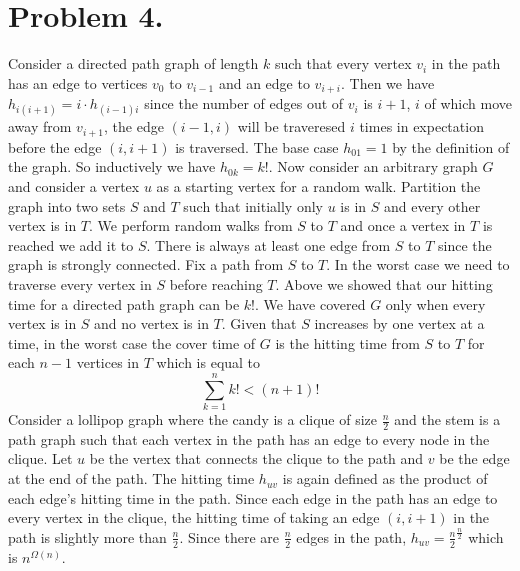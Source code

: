 \documentclass[12pt]{article}
\begin{document}
\section*{Problem 4.}
Consider a directed path graph of length $k$ such that every vertex $v_i$ in the
path has an edge to vertices $v_0$ to $v_{i-1}$ and an edge to $v_{i+i}$. Then
we have $h_{i(i+1)} = i \cdot h_{(i-1)i}$ since the number of edges out of $v_i$
is $i+1$, $i$ of which move away from $v_{i+1}$, the edge $(i-1, i)$ will be
traveresed $i$ times in expectation before the edge $(i,i+1)$ is traversed. The
base case $h_{01} = 1$ by the definition of the graph. So inductively we have
$h_{0k} = k!$. Now consider an arbitrary graph $G$ and consider a vertex
$u$ as a starting vertex for a random walk. Partition the graph into two
sets $S$ and $T$ such that initially only $u$ is in $S$ and every other vertex
is in $T$. We perform random walks from $S$ to $T$ and once a vertex in $T$ is
reached we add it to $S$. There is always at least one edge from $S$ to $T$ since
the graph is strongly connected. Fix a path from $S$ to $T$. In the worst case
we need to traverse every vertex in $S$ before reaching $T$. Above we showed that
our hitting time for a directed path graph can be $k!$. We have covered $G$
only when every vertex is in $S$ and no vertex is in $T$. Given that $S$ increases
by one vertex at a time, in the worst case the cover time of $G$ is the hitting
time from $S$ to $T$ for each $n-1$ vertices in $T$ which is equal to
$$\sum_{k=1}^{n} k! < (n+1)!$$
Consider a lollipop graph where the candy is a clique of size $\frac{n}{2}$ and
the stem is a path graph such that each vertex in the path has an edge to every
node in the clique. Let $u$ be the vertex that connects the clique to the
path and $v$ be the edge at the end of the path. The hitting time $h_{uv}$ is
again defined as the product of each edge's hitting time in the path. Since
each edge in the path has an edge to every vertex in the clique, the hitting time
of taking an edge $(i,i+1)$ in the path is slightly more than $\frac{n}{2}$.
Since there are $\frac{n}{2}$ edges in the path,
$h_{uv} = \frac{n}{2}^{\frac{n}{2}}$ which is $n^{\Omega(n)}$.
\end{document}
